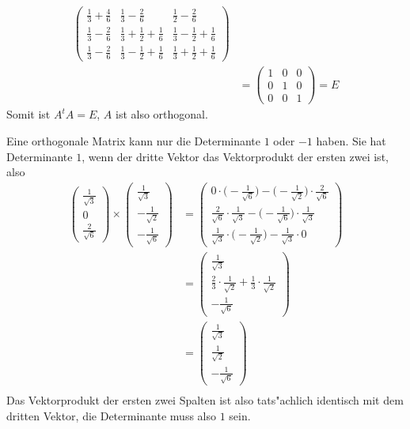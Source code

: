\begin{loesung}
\begin{teilaufgaben}
\begin{align*}
\begin{pmatrix}
\frac13+\frac46 & \frac13-\frac26         & \frac12 -\frac26       \\
\frac13-\frac26 & \frac13+\frac12+\frac16 & \frac13-\frac12+\frac16\\
\frac13-\frac26 & \frac13-\frac12+\frac16 & \frac13+\frac12+\frac16
\end{pmatrix}
\\
&=\begin{pmatrix}
1&0&0\\
0&1&0\\
0&0&1
\end{pmatrix}
=E
\end{align*}
Somit ist $A^tA=E$, $A$ ist also orthogonal.
\item
Eine orthogonale Matrix kann nur die Determinante $1$ oder $-1$ haben.
Sie hat Determinante $1$, wenn der dritte Vektor das Vektorprodukt der
ersten zwei ist, also
\begin{align*}
\begin{pmatrix}
\frac1{\sqrt{3}}\\0\\\frac{2}{\sqrt{6}}
\end{pmatrix}\times\begin{pmatrix}
\frac1{\sqrt{3}}\\-\frac1{\sqrt{2}}\\-\frac1{\sqrt{6}}
\end{pmatrix}
&=
\begin{pmatrix}
0\cdot\bigl(-\frac1{\sqrt{6}}\bigr)-\bigl(-\frac1{\sqrt{2}}\bigr)\cdot\frac2{\sqrt{6}}\\
\frac2{\sqrt{6}}\cdot\frac1{\sqrt{3}}-\bigl(-\frac1{\sqrt{6}} \bigr)\cdot\frac1{\sqrt{3}}\\
\frac1{\sqrt{3}}\cdot\bigl(-\frac1{\sqrt{2}}\bigr)-\frac1{\sqrt{3}}\cdot 0
\end{pmatrix}
\\
&=\begin{pmatrix}
\frac1{\sqrt{3}}\\
\frac23\cdot\frac1{\sqrt{2}}+\frac13\cdot\frac1{\sqrt{2}}\\
-\frac1{\sqrt{6}}
\end{pmatrix}
\\
&=\begin{pmatrix}
\frac1{\sqrt{3}}\\
\frac1{\sqrt{2}}\\
-\frac1{\sqrt{6}}
\end{pmatrix}
\\
\end{align*}
Das Vektorprodukt der ersten zwei Spalten ist also tats"achlich
identisch mit dem dritten Vektor, die Determinante muss also $1$ sein.


\end{teilaufgaben}
\end{loesung}
